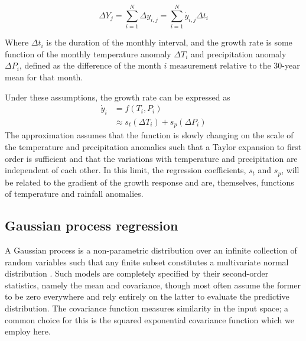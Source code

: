 \documentclass[12pt]{iopart}
\newcommand{\remove}[1]{}
\newcommand{\add}[1]{#1}
\begin{document}
\begin{equation}
\Delta Y_j = \sum_{i=1}^{N} \Delta y_{i,j} = \sum_{i=1}^{N} \dot{y}_{i,j}\Delta t_i
\end{equation}

Where $\Delta t_i$ is the duration of the monthly interval, and the growth rate is some function of the monthly temperature anomaly $\Delta T_i$ and precipitation anomaly $\Delta P_i$, defined as the difference of the month $i$ measurement relative to the 30-year mean for that month. 

\remove{While the analysis considers only temperature and precipitation influences, the derived growth rate actually represents the projection of the full multi-dimensional growth response function onto the temperature and precipitation axes. The factors that are not included in the fitting procedure (including solar radiation, soil moisture and type) will contribute to the scale of variance in model prediction residuals compared to true values.}

Under these assumptions, the growth rate can be expressed as
\begin{align}
\dot{y}_i &= f(T_i, P_i) \\
& \approx s_t(\Delta T_i) + s_p(\Delta P_i)
\end{align}
The approximation assumes that the function is slowly changing on the scale of the temperature and precipitation anomalies such that a Taylor expansion to first order is sufficient and that the variations with temperature and precipitation are independent of each other. In this limit, the regression coefficients\add{, $s_t$ and $s_p$,} will be related to the gradient of the growth response and are, themselves, functions of temperature and rainfall\add{ anomalies}.

\subsection{Gaussian process regression}
\label{sec:GP_descrip_appendix}
A Gaussian process is a non-parametric distribution over an infinite collection of random variables such that any finite subset constitutes a multivariate normal distribution \citep{rasmussen:2005}. Such models are completely specified by their second-order statistics, namely the mean and covariance, though most often assume the former to be zero everywhere and rely entirely on the latter to evaluate the predictive distribution. The covariance function measures similarity in the input space; a common choice for this is the squared exponential covariance function which we employ here. 
\end{document}
